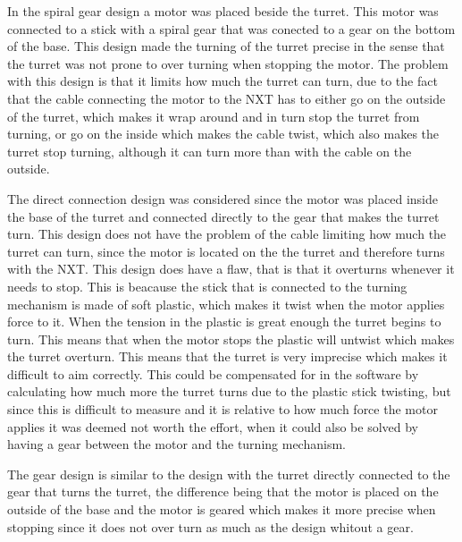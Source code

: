 In the spiral gear design a motor was placed beside the turret. This motor was
connected to a stick with a spiral gear that was conected to a gear on the bottom of the base. This design
made the turning of the turret precise in the sense that the turret was not
prone to over turning when stopping the motor. The problem with this design is
that it limits how much the turret can turn, due to the fact that the cable
connecting the motor to the NXT has to either go on the outside of the turret,
which makes it wrap around and in turn stop the turret from turning, or go on
the inside which makes the cable twist, which also makes the turret stop
turning, although it can turn more than with the cable on the outside.\nl

The direct connection design was considered since the motor was placed inside
the base of the turret and connected directly to the gear that makes the turret turn. This
design does not have the problem of the cable limiting how much the turret can
turn, since the motor is located on the the turret and therefore turns with the
NXT. This design does have a flaw, that is that it overturns whenever it needs
to stop. This is beacause the stick that is connected to the turning mechanism
is made of soft plastic, which makes it twist when the motor applies force to
it. When the tension in the plastic is great enough the turret begins to turn.
This means that when the motor stops the plastic will untwist which makes the
turret overturn. This means that the turret is very imprecise which makes it
difficult to aim correctly. This could be compensated for in the software by
calculating how much more the turret turns due to the plastic stick twisting,
but since this is difficult to measure and it is relative to how much force the motor applies it was deemed
not worth the effort, when it could also be solved by having a gear between
the motor and the turning mechanism.\nl

The gear design is similar to the design with the turret directly connected to
the gear that turns the turret, the difference being that the motor is placed on
the outside of the base and the motor is geared which makes it more precise when
stopping since it does not over turn as much as the design whitout a gear. 


